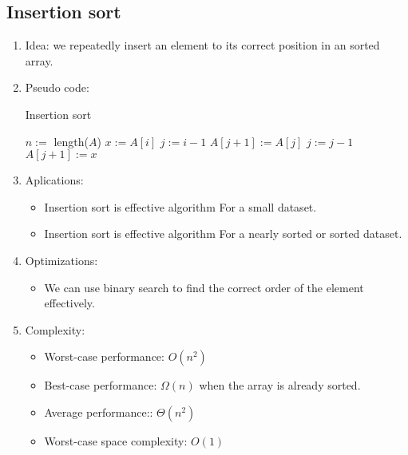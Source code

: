 \documentclass[12pt]{article}
\begin{document}
    \subsection{Insertion sort}
    \begin{enumerate}
        \item Idea: we repeatedly insert an element to its correct position in an sorted array.
        \item Pseudo code:
        \begin{algorithm}[H]
            \caption{Insertion sort}
            \begin{algorithmic}[1]
                    \State $n:=$ length($A$)
                        \State $x:=A[i]$
                        \State $j:=i-1$
                            \State $A[j+1]:=A[j]$
                            \State $j:=j-1$
                        \EndWhile
                        \State $A[j+1]:=x$
                    \EndFor
                \EndFunction
            \end{algorithmic}
        \end{algorithm}
        \item Aplications:
        \begin{itemize}
            \item Insertion sort is effective algorithm For a small dataset.
            \item Insertion sort is effective algorithm For a nearly sorted or sorted dataset.
        \end{itemize}
        \item Optimizations:
        \begin{itemize}
            \item We can use binary search to find the correct order of the element effectively.
        \end{itemize}
        \item Complexity:
        \begin{itemize}
            \item Worst-case performance: $O(n^2)$
            \item Best-case performance: $\Omega(n)$ when the array is already sorted.
            \item Average performance:: $\Theta(n^2)$
            \item Worst-case space complexity: $O(1)$
        \end{itemize}
    \end{enumerate}
\end{document}
